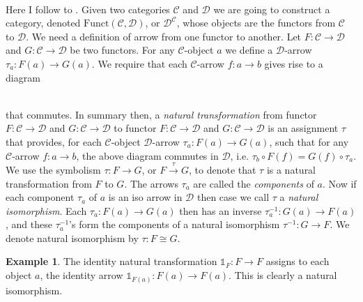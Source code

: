 \documentclass[10]{article}
\theoremstyle{plain}
\theoremstyle{definition}
\theoremstyle{definition}
\newtheorem{example}[prop]{Example}
\numberwithin{equation}{section}
\newcommand{\7}{\dagger}                     %
\newcommand{\8}{\bullet}                     %
\renewcommand{\.}{\cdot}                     %
\renewcommand{\:}{\colon}                    %
\renewcommand{\:}{\colon}           %
\begin{document}
\begin{appendices}
			\paragraph{}
			Here I follow to \cite{goldblatt:topoi}.
			Given two categories $\mathscr C$ and $\mathscr D$ we are going to construct a category, 
			denoted $\mathrm{Funct}\left(\mathscr C, \mathscr D\right)$, or $\mathscr D^{\mathscr C}$, whose objects are the functors from $\mathscr C$ to $\mathscr D$. 
			We need a definition of arrow from one functor to another. Let 
			$F: \mathscr C\to \mathscr D$ and $G: \mathscr C\to \mathscr D$ be two functors. For any $\mathscr C$-object $a$ we define a $\mathscr D$-arrow $\tau_a : F\left(a\right)\to  G\left(a\right)$. We require that each  $\mathscr C$-arrow $f: a \to b$  gives rise to a diagram 
			\\
			\\ 	
			that commutes.
			In summary then, a \textit{natural transformation} from functor $F: \mathscr C\to \mathscr D$ and $G: \mathscr C\to \mathscr D$  to functor $F: \mathscr C\to \mathscr D$ and $G: \mathscr C\to \mathscr D$  is an assignment $\tau$ that provides, for each $\mathscr C$-object $\mathscr D$-arrow $\tau_a :F(a) \to G(a)$, such that for any $\mathscr C$-arrow $f:a\to b$, the above diagram commutes in $\mathscr D$, i.e. $\tau_b \circ F(f)= G(f)\circ \tau_a$. We use the symbolism $\tau: F\to G$, or $F \xrightarrow{\tau}G$, to denote that $\tau$ is a natural transformation from $F$ to $G$. The arrows $\tau_a$ are called the \textit{components} of $a$. Now if each component $\tau_a$ of $a$ is an iso arrow in $\mathscr D$ then  case we call $\tau$ a \textit{natural isomorphism}. Each $\tau_a: F(a)\to G(a)$ then has an inverse $\tau_a^{-1}: G(a) \to F(a)$, and these $\tau^{-1}_a$'s form the components of a natural isomorphism $\tau^{-1}: G \to F$. We denote natural isomorphism by $\tau: F \cong G$. 
			\begin{example}
				The identity natural transformation $\mathbb{1}_F :F\to F$ assigns to each object $a$, the identity arrow $\mathbb{1}_{F(a)}:F(a)\to F(a)$. This is clearly a natural isomorphism. 
			\end{example}
			

\end{appendices}
\end{document}
